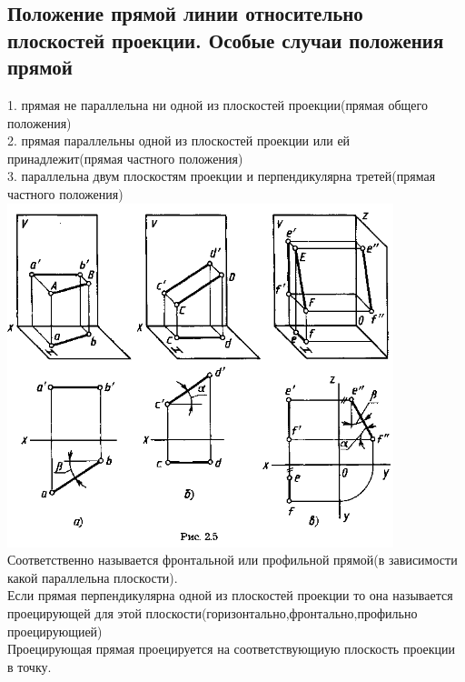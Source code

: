 \documentclass[a4paper, 12pt]{article}
\begin{document}
\subsection{Положение прямой линии относительно плоскостей проекции. Особые случаи положения прямой}
1. прямая не параллельна ни одной из плоскостей проекции(прямая общего положения)\\
2. прямая параллельны одной из плоскостей проекции или ей принадлежит(прямая частного положения)\\
3. параллельна двум плоскостям проекции и перпендикулярна третей(прямая частного положения)\\
\includegraphics{img/221.png}\\
Соответственно называется фронтальной или профильной прямой(в зависимости какой параллельна плоскости).\\
Если прямая перпендикулярна одной из плоскостей проекции то она называется проецирующей для этой плоскости(горизонтально,фронтально,профильно проецирующией)\\
Проецирующая прямая проецируется на соответствующиую плоскость проекции в точку.\\
\end{document}
